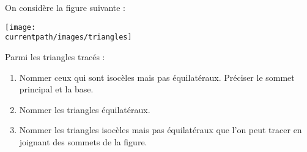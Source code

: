 \begin{exercice}
    On considère la figure suivante :
    \vspace*{-2mm}
    \begin{center}
      \texttt{[image: \\currentpath/images/triangles]}
    \end{center}  
    \vspace*{-3mm}  
    Parmi les triangles tracés : 
    \vspace*{-2mm}   
    \begin{enumerate}
       \item Nommer ceux qui sont isocèles mais pas équilatéraux. Préciser le sommet principal et la base.
       \item Nommer les triangles équilatéraux.
       \item Nommer les triangles isocèles mais pas équilatéraux que l'on peut tracer en joignant des sommets de la figure.
    \end{enumerate}
    \vspace*{-2mm}
\end{exercice}
 